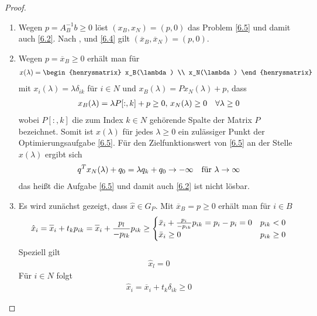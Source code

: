 \begin{proof}
	\begin{enumerate}[label=(\alph*)]
		\item  Wegen $p=A^{-1}_Bb\ge 0$ löst $(x_B,x_N)=(p,0)$ das Problem \cref{6.5} und damit auch \cref{6.2}. Nach ,  und \cref{6.4} gilt $(\overline{x}_B,\overline{x}_N)=(p,0)$.
		\item Wegen $p=\overline{x}_B\ge 0$ erhält man für 
		\begin{align}
			x(\lambda)=\begin{henrysmatrix}
				x_B(\lambda) \\ x_N(\lambda)
			\end{henrysmatrix} \notag
		\end{align}
		mit $x_i(\lambda)=\lambda\delta_{ik}$ für $i\in N$ und $x_B(\lambda)=Px_N(\lambda)+p$, dass
		\begin{align}
			x_B(\lambda) = \lambda P[:,k]+p\ge 0,\, x_N(\lambda)\ge 0\quad\forall\lambda\ge 0\notag
		\end{align}
		wobei $P[:,k]$ die zum Index $k\in N$ gehörende Spalte der Matrix $P$ bezeichnet. Somit ist $x(\lambda)$ für jedes $\lambda\ge 0$ ein zulässiger Punkt der Optimierungsaufgabe \cref{6.5}. Für den Zielfunktionswert von \cref{6.5} an der Stelle $x(\lambda)$ ergibt sich
		\begin{align}
			q^Tx_N(\lambda) + q_0 = \lambda q_k+q_0\to -\infty\quad\text{für } \lambda\to\infty\notag
		\end{align}
		das heißt die Aufgabe \cref{6.5} und damit auch \cref{6.2} ist nicht lösbar.
		\item Es wird zunächst gezeigt, dass $\hat{x}\in G_P$. Mit $\overline{x}_B=p\ge 0$ erhält man für $i\in B$
		\begin{align}
			\hat{x}_i = \overline{x}_i + t_kp_{ik} = \overline{x}_i + \frac{p_l}{-p_{lk}}p_{ik} \ge \begin{cases}
				\overline{x}_i + \frac{p_i}{-p_{ik}}p_{ik} = p_i-p_i = 0 & p_{ik}<0 \\
				\overline{x}_i \ge 0 & p_{ik}\ge 0 
			\end{cases}\notag
		\end{align}
		Speziell gilt
		\begin{align}
			\label{6.6}
			\hat{x}_l = 0
		\end{align}
		Für $i\in N$ folgt
		\begin{align}
			\label{6.7}
			\hat{x}_i = \overline{x}_i + t_k\delta_{ik}\ge 0
		\end{align}

\end{enumerate}
\end{proof}

